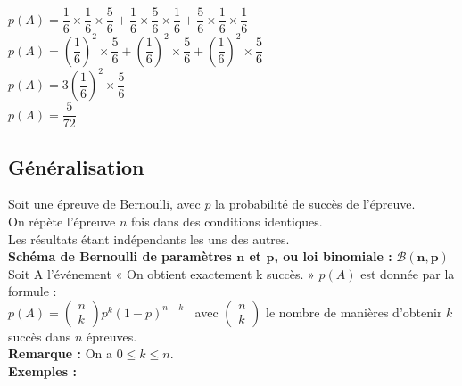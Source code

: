 $ p\left(A\right) = \dfrac{1}{6} \times \dfrac{1}{6} \times \dfrac{5}{6} + \dfrac{1}{6} \times \dfrac{5}{6} \times \dfrac{1}{6} + \dfrac{5}{6} \times \dfrac{1}{6} \times \dfrac{1}{6} $ \\

$ p\left(A\right) =  \left(\dfrac{1}{6}\right)^2 \times \dfrac{5}{6} + \left(\dfrac{1}{6}\right)^2 \times \dfrac{5}{6} + \left(\dfrac{1}{6}\right)^2 \times \dfrac{5}{6} $ \\

$p\left(A\right) = 3 \left(\dfrac{1}{6} \right)^2 \times \dfrac{5}{6} $ \\

$ p\left(A\right) = \dfrac{5}{72} $

\vspace*{-5cm}

\newpage

\subsection{Généralisation}

Soit une épreuve de Bernoulli, avec $p$ la probabilité de succès de l'épreuve. \\
On répète l'épreuve $n$ fois dans des conditions identiques. \\ Les résultats étant indépendants les uns des autres. \\

\textbf{Schéma de Bernoulli de paramètres $\mathbf{n}$ et $\mathbf{p}$, ou loi binomiale :} $\mathbf{\mathcal{B} \left(n,p\right)}$ \\

Soit A l'événement « On obtient exactement k succès. » $p(A)$ est donnée par la formule : \\

$ p\left(A\right)  = \left(\begin{array}{c} n \\ k \end{array} \right) p^k \left(1-p\right)^{n-k} \; \;  $ avec $\left(\begin{array}{c} n \\ k \end{array} \right)$ le nombre de manières d'obtenir $k$ succès dans $n$ épreuves. \\

\textbf{Remarque :} On a $ 0 \leqslant k \leqslant n $.  \\

\textbf{Exemples :}

